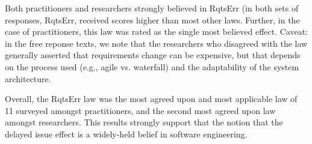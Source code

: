 Both  practitioners and researchers  strongly believed in RqtsErr (in both sets of responses, RqtsErr, received  scores higher than most
other laws. Further, in the case of practitioners, this law was rated
as the single most believed effect. 
Caveat: in the free reponse texts, we note that the researchers who disagreed with the law generally asserted that requirements change can be expensive, but that depends on the process used (e.g., agile vs. waterfall) and the adaptability of the system architecture.

Overall, the RqtsErr law was the most agreed upon and most applicable law of 11 surveyed amongst practitioners, and the second most agreed upon law amongst researchers. 
This results strongly support that the notion that the  delayed issue effect   is a widely-held belief in software engineering.